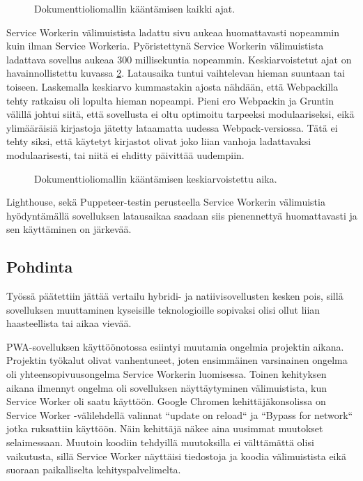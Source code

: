 \documentclass{tktltiki}
\begin{document}
\begin{figure}[h]
\begin{center}
\caption{Dokumenttioliomallin kääntämisen kaikki ajat.}
\label{Dom Interactive palkit}
\end{center}
\end{figure}

Service Workerin välimuistista ladattu sivu aukeaa huomattavasti nopeammin kuin ilman Service Workeria. Pyöristettynä Service Workerin välimuistista ladattava sovellus aukeaa 300 millisekuntia nopeammin. Keskiarvoistetut ajat on havainnollistettu kuvassa \ref{Dom Interactive keskiarvoistettu aika}. Latausaika tuntui vaihtelevan hieman suuntaan tai toiseen. Laskemalla keskiarvo kummastakin ajosta nähdään, että Webpackilla tehty ratkaisu oli lopulta hieman nopeampi. Pieni ero Webpackin ja Gruntin välillä johtui siitä, että sovellusta ei oltu optimoitu tarpeeksi modulaariseksi, eikä ylimääräisiä kirjastoja jätetty lataamatta uudessa Webpack-versiossa. Tätä ei tehty siksi, että käytetyt kirjastot olivat joko liian vanhoja ladattavaksi modulaarisesti, tai niitä ei ehditty päivittää uudempiin.

\begin{figure}[h]
\begin{center}
\caption{Dokumenttioliomallin kääntämisen keskiarvoistettu aika.}
\label{Dom Interactive keskiarvoistettu aika}
\end{center}
\end{figure}

Lighthouse, sekä Puppeteer-testin perusteella Service Workerin välimuistia hyödyntämällä sovelluksen latausaikaa saadaan siis pienennettyä huomattavasti ja sen käyttäminen on järkevää. 

\clearpage
\subsection{Pohdinta}

Työssä päätettiin jättää vertailu hybridi- ja natiivisovellusten kesken pois, sillä sovelluksen muuttaminen kyseisille teknologioille sopivaksi olisi ollut liian haasteellista tai aikaa vievää.

PWA-sovelluksen käyttöönotossa esiintyi muutamia ongelmia projektin aikana. Projektin työkalut olivat vanhentuneet, joten ensimmäinen varsinainen ongelma oli yhteensopivuusongelma Service Workerin luomisessa. Toinen kehityksen aikana ilmennyt ongelma oli sovelluksen näyttäytyminen välimuistista, kun Service Worker oli saatu käyttöön. Google Chromen kehittäjäkonsolissa on Service Worker -välilehdellä valinnat “update on reload“ ja “Bypass for network“ jotka ruksattiin käyttöön. Näin kehittäjä näkee aina uusimmat muutokset selaimessaan. Muutoin koodiin tehdyillä muutoksilla ei välttämättä olisi vaikutusta, sillä Service Worker näyttäisi tiedostoja ja koodia välimuistista eikä suoraan paikalliselta kehityspalvelimelta. 
\end{document}
